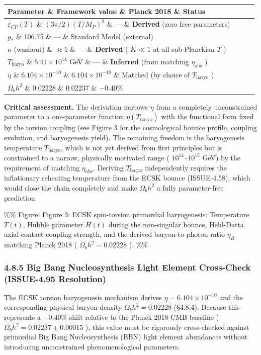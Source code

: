 \documentclass[11pt,a4paper]{article}
\theoremstyle{definition}\newtheorem{definition}{Definition}
\theoremstyle{remark}\newtheorem{remark}{Remark}
\begin{document}
\begin{longtable}{llll}
\hline
Parameter \& Framework value \& Planck 2018 \& Status \\
\hline
$\varepsilon_{CP}(T)$ \& $(3\pi/2)(T/M_P)^2$ \& — \& \textbf{Derived} (zero free parameters) \\
$g_*$ \& 106.75 \& — \& Standard Model (external) \\
$\kappa$ (washout) \& $\approx 1$ \& — \& \textbf{Derived} ( $K \ll 1$ at all sub-Planckian $T$ ) \\
$T_{\text{baryo}}$ \& $5.41 \times 10^{14}$ GeV \& — \& \textbf{Inferred} (from matching $\eta_{\text{obs}}$ ) \\
$\eta$ \& $6.104 \times 10^{-10}$ \& $6.104 \times 10^{-10}$ \& Matched (by choice of $T_{\text{baryo}}$ ) \\
$\Omega_b h^2$ \& 0.02228 \& 0.02237 \& $-0.40\%$ \\
\hline
\end{longtable}
\textbf{Critical assessment.} The derivation narrows $\eta$ from a completely unconstrained parameter to a one-parameter function $\eta(T_{\text{baryo}})$ with the functional form fixed by the torsion coupling (see Figure 3 for the cosmological bounce profile, coupling evolution, and baryogenesis yield). The remaining freedom is the baryogenesis temperature $T_{\text{baryo}}$, which is not yet derived from first principles but is constrained to a narrow, physically motivated range ( $10^{14}$–$10^{15}$ GeV) by the requirement of matching $\eta_{\text{obs}}$. Deriving $T_{\text{baryo}}$ independently requires the inflationary reheating temperature from the ECSK bounce (ISSUE-4.58), which would close the chain completely and make $\Omega_b h^2$ a fully parameter-free prediction.

\%\% Figure: Figure 3: ECSK spin-torsion primordial baryogenesis: Temperature $T(t)$, Hubble parameter $H(t)$ during the non-singular bounce, Hehl-Datta axial contact coupling strength, and the derived baryon-to-photon ratio $\eta_B$ matching Planck 2018 ( $\Omega_b h^2 = 0.02228$ ). \%\%
\subsubsection{4.8.5 Big Bang Nucleosynthesis Light Element Cross-Check (ISSUE-4.95 Resolution)}

The ECSK torsion baryogenesis mechanism derives $\eta = 6.104 \times 10^{-10}$ and the corresponding physical baryon density $\Omega_b h^2 = 0.02228$ (§4.8.4). Because this represents a $-0.40\%$ shift relative to the Planck 2018 CMB baseline ( $\Omega_b h^2 = 0.02237 \pm 0.00015$ ), this value must be rigorously cross-checked against primordial Big Bang Nucleosynthesis (BBN) light element abundances without introducing unconstrained phenomenological parameters.
\end{document}
